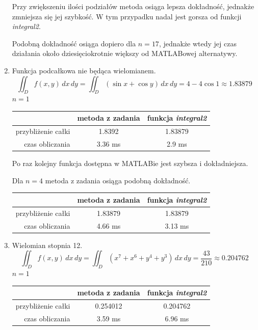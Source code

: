 \documentclass[12pt]{article}
\begin{document}
\begin{enumerate}[label=\textbf{Przykład \arabic*}]
		Przy zwiększeniu ilości podziałów metoda osiąga lepsza dokładność, jednakże zmniejsza się jej szybkość. W tym przypadku nadal jest gorsza od funkcji \textit{integral2}.
		
		Podobną dokładność osiąga dopiero dla $n = 17$, jednakże wtedy jej czas działania około dziesięciokrotnie większy od MATLABowej alternatywy.
		
		
		\item
		Funkcja podcałkowa nie będąca wielomianem.
		$$\iint_D f(x, y) \,dx\,dy = \iint_D (\sin x + \cos y) \,dx\,dy = 4 - 4\cos 1 \approx 1.83879$$
		$n = 1$
		
		\begin{table}[H]
			\centering
			\begin{tabular}{|r|c|c|}
				\hline
				                   & metoda z zadania & funkcja \textit{integral2} \\ \hline
				przybliżenie całki &      1.8392      &          1.83879           \\ \hline
				   czas obliczania &     3.36 ms      &           2.9 ms           \\ \hline
			\end{tabular}
		\end{table}
		
		Po raz kolejny funkcja dostępna w MATLABie jest szybsza i dokładniejsza.
		
		Dla $n = 4$ metoda z zadania osiąga podobną dokładność.
		\begin{table}[H]
			\centering
			\begin{tabular}{|r|c|c|}
				\hline
				                   & metoda z zadania & funkcja \textit{integral2} \\ \hline
				przybliżenie całki &     1.83879      &          1.83879           \\ \hline
				   czas obliczania &     4.66 ms      &          3.13 ms           \\ \hline
			\end{tabular}
		\end{table}
	
	
	
		\item
		Wielomian stopnia 12.
		$$\iint_D f(x, y) \,dx\,dy = \iint_D (x^7 + x^6 + y^4 + y^3) \,dx\,dy = \frac{43}{210} \approx 0.204762$$
		$n = 1$
		
		\begin{table}[H]
			\centering
			\begin{tabular}{|r|c|c|}
				\hline
				                   & metoda z zadania & funkcja \textit{integral2} \\ \hline
				przybliżenie całki &     0.254012     & 0.204762                   \\ \hline
				   czas obliczania &     3.59 ms      & 6.96 ms                    \\ \hline
			\end{tabular}
		\end{table}
	

\end{enumerate}
\end{document}
